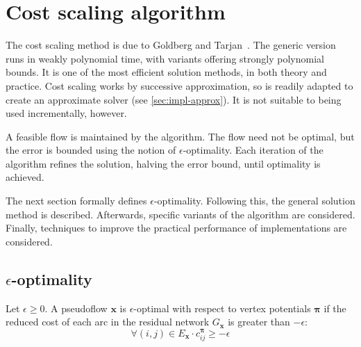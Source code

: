 \section{Cost scaling algorithm} \label{sec:impl-cost-scaling}


The cost scaling method is due to Goldberg and Tarjan~\cite{Goldberg:1987}. The generic version runs in weakly polynomial time, with variants offering strongly polynomial bounds. It is one of the most efficient solution methods, in both theory and practice\footnotemark. Cost scaling works by successive approximation, so is readily adapted to create an approximate solver (see \cref{sec:impl-approx}). It is not suitable to being used incrementally, however.

A feasible flow is maintained by the algorithm. The flow need not be optimal, but the error is bounded using the notion of $\epsilon$-optimality. Each iteration of the algorithm refines the solution, halving the error bound, until optimality is achieved.

The next section formally defines $\epsilon$-optimality. Following this, the general solution method is described. Afterwards, specific variants of the algorithm are considered. Finally, techniques to improve the practical performance of implementations are considered.

\subsection{\texorpdfstring{$\epsilon$}{epsilon}-optimality}

\begin{defn}
\label{defn:epsilon-optimality}
Let $\epsilon \geq 0$. A pseudoflow $\mathbf{x}$ is $\epsilon$-optimal with respect to vertex potentials $\boldsymbol{\pi}$ if the reduced cost of each arc in the residual network $G_\mathbf{x}$ is greater than $-\epsilon$:
\begin{equation} \label{eq:epsilon-optimality}
\forall (i,j) \in E_{\mathbf{x}}\cdot c^{\boldsymbol{\pi}}_{ij} \geq -\epsilon
\end{equation}
\end{defn}

